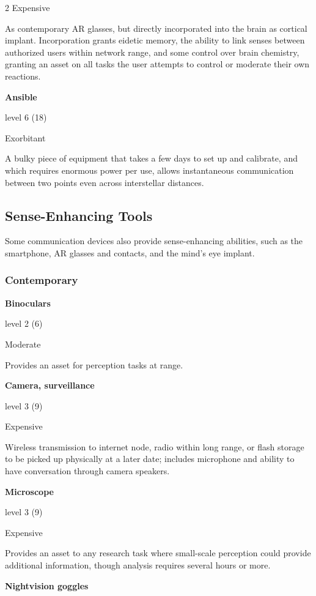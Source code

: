 \begin{multicols}{2}
Expensive 

As contemporary AR glasses, but directly incorporated into the brain as cortical implant. Incorporation grants eidetic memory, the ability to link senses between authorized users within network range, and some control over brain chemistry, granting an asset on all tasks the user attempts to control or moderate their own reactions. 

\textbf{Ansible}

level 6 (18) 

Exorbitant 

A bulky piece of equipment that takes a few days to set up and calibrate, and which requires enormous power per use, allows instantaneous communication between two points even across interstellar distances.

\subsection{Sense-Enhancing Tools}

Some communication devices also provide sense-enhancing abilities, such as the smartphone, AR glasses and contacts, and the mind’s eye implant. 

\subsubsection{Contemporary}

\textbf{Binoculars}

level 2 (6) 

Moderate 

Provides an asset for perception tasks at range. 

\textbf{Camera, surveillance}

level 3 (9) 

Expensive 

Wireless transmission to internet node, radio within long range, or flash storage to be picked up physically at a later date; includes microphone and ability to have conversation through camera speakers. 

\textbf{Microscope}

level 3 (9) 

Expensive 

Provides an asset to any research task where small-scale perception could provide additional information, though analysis requires several hours or more. 

\textbf{Nightvision goggles}


\end{multicols}
